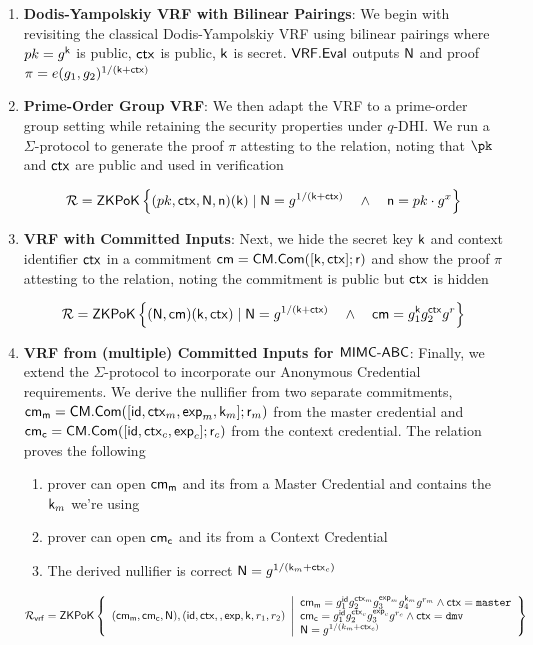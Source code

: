 \begin{enumerate}
    \item \textbf{Dodis-Yampolskiy VRF with Bilinear Pairings}: We begin with revisiting the classical Dodis-Yampolskiy VRF using bilinear pairings where 
    $pk = g^{\mathsf{k}}$ is public, $\mathsf{ctx}$ is public, $\mathsf{k}$ is secret. $\mathsf{VRF.Eval}$ outputs $\mathsf{N}$ and proof $\pi = e(g_1, g_2)^{1/(\mathsf{k} + \mathsf{ctx})}$
    
    \item \textbf{Prime-Order Group VRF}: We then adapt the VRF to a prime-order group setting while retaining the security properties under $q$-DHI. We run a $\Sigma$-protocol to generate the proof $\pi$ attesting to the relation, noting that $\pk$ and $\mathsf{ctx}$ are public and used in verification

    \[
    \mathcal{R} = {\mathsf{ZKPoK}} \left\{(pk, \mathsf{ctx}, \mathsf{N}, \mathsf{n}) (\mathsf{k}) \mid \mathsf{N} = g^{1/(\mathsf{k} + \mathsf{ctx})} \quad \wedge \quad \mathsf{n} =  pk \cdot g^x  \right\}
    \]
    
    \item \textbf{VRF with Committed Inputs}: Next, we hide the secret key $\mathsf{k}$ and context identifier $\mathsf{ctx}$ in a commitment $\mathsf{cm} = \mathsf{CM.Com}([\mathsf{k}, \mathsf{ctx}]; \mathsf{r})$ and show the proof $\pi$ attesting to the relation, noting the commitment is public but $\mathsf{ctx}$ is hidden

    \[
    \mathcal{R} = {\mathsf{ZKPoK}} \left\{ (\mathsf{N}, \mathsf{cm})(\mathsf{k}, \mathsf{ctx}) \mid \mathsf{N} = g^{1/(\mathsf{k} + \mathsf{ctx})} \quad \wedge \quad \mathsf{cm} = g_1^{\mathsf{k}} g_2^{\mathsf{ctx}}g^r  \right\}
    \]

    \item \textbf{VRF from (multiple) Committed Inputs for $\mathsf{MIMC\text{-}ABC}$}: Finally, we extend the $\Sigma$-protocol to incorporate our Anonymous Credential requirements. We derive the nullifier from two separate commitments, $\mathsf{cm_m} = \mathsf{CM.Com}([\mathsf{id}, \mathsf{ctx}_m, \mathsf{exp}_m, \mathsf{k}_m]; \mathsf{r}_m)$ from the master credential and $\mathsf{cm_c} = \mathsf{CM.Com}([\mathsf{id}, \mathsf{ctx}_c, \mathsf{exp}_c]; \mathsf{r}_c)$ from the context credential. The relation proves the following 
    \begin{enumerate}
        \item prover can open $\mathsf{cm_m}$ and its from a Master Credential and contains the $\mathsf{k}_m$ we're using %
        \item prover can open $\mathsf{cm_c}$ and its from a Context Credential
        \item The derived nullifier is correct $\mathsf{N} = g^{1/(\mathsf{k}_m + \mathsf{ctx}_c)}$ 
    \end{enumerate}
    
    \[
        \mathcal{R}_{\mathsf{vrf}} = {\mathsf{ZKPoK}} \left\{ 
        \begin{array}{l} 
        (\mathsf{cm_m}, \mathsf{cm_c}, \mathsf{N}), (\mathsf{id}, \mathsf{ctx}, , \mathsf{exp}, \mathsf{k}, r_1, r_2) \\
        \end{array} 
        \middle|
        \begin{array}{l}
            \mathsf{cm_m} = g_1^{\mathsf{id}}g_2^{\mathsf{ctx}_m}g_3^{\mathsf{exp}_m}g_4^{\mathsf{k}_m}g^{r_m}  \wedge \mathsf{ctx}=\texttt{master} \\
            \mathsf{cm_c} = g_1^{\mathsf{id}}g_2^{\mathsf{ctx}_c}g_3^{\mathsf{exp}_c}g^{r_c} \wedge \mathsf{ctx}=\texttt{dmv} \\
            \mathsf{N} = g^{1/(k_m + \mathsf{ctx}_c)}
        \end{array} 
        \right\}
    \]


\end{enumerate}
